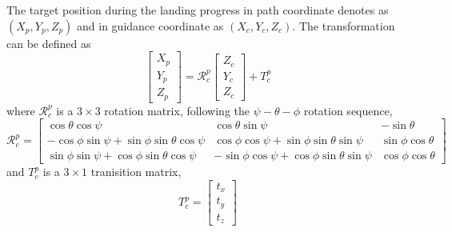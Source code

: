 \documentclass[journal,article,submit,moreauthors,pdftex,10pt,a4paper]{mdpi}
\begin{document}

The target position during the landing progress in path coordinate denotes as $(X_p, Y_p, Z_p)$ and in guidance coordinate as $(X_c, Y_c, Z_c)$. The transformation can be defined as 
\begin{equation}
\left[ {\begin{array}{*{20}{c}}
	{{X_p}} \\ 
	{{Y_p}} \\ 
	{{Z_p}} 
	\end{array}} \right] = \mathcal{R}_c^p\left[ {\begin{array}{*{20}{c}}
	{{Z_{c}}} \\ 
	{{Y_{c}}} \\ 
	{{Z_{c}}} 
	\end{array}} \right] + T_c^p
\end{equation}
where $\mathcal{R}_c^p$ is a $3\times3$ rotation matrix, following the $\psi-\theta-\phi$ rotation sequence,
\begin{equation}
\mathcal{R}_c^p = \begin{bmatrix}
\cos \theta \cos \psi                             & \cos\theta \sin\psi                               & -\sin\theta         \\
-\cos\phi \sin\psi + \sin\phi \sin\theta \cos\psi & \cos\phi \cos\psi + \sin\phi \sin\theta\sin\psi   & \sin\phi \cos\theta \\
\sin\phi \sin\psi + \cos\phi \sin\theta \cos\psi  & -\sin\phi \cos\psi + \cos\phi \sin\theta \sin\psi & \cos\phi \cos\theta
\end{bmatrix}
\end{equation}
and $T_c^p$ is a $3\times1$ tranisition matrix,
\begin{equation}
T_c^p=\left[ {\begin{array}{*{20}{c}}
	t_x \\ 
	t_y \\ 
	t_z 
	\end{array}} \right]
\end{equation}
\end{document}
